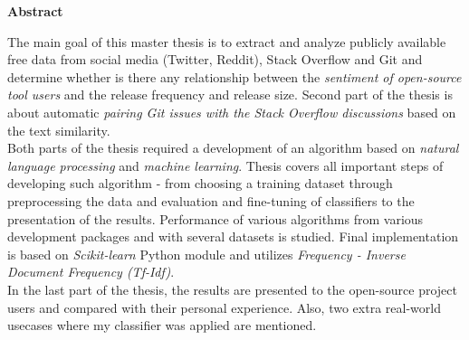 \begin{center}
\textbf{Abstract}
\end{center}

The main goal of this master thesis is to extract and analyze publicly available free data from social media (Twitter, Reddit), Stack Overflow and Git and determine whether is there any relationship between the \textit{sentiment of open-source tool users} and the release frequency and release size. Second part of the thesis is about automatic \textit{pairing Git issues with the Stack Overflow discussions} based on the text similarity.\\
Both parts of the thesis required a development of an algorithm based on \textit{natural language processing} and \textit{machine learning}. Thesis covers all important steps of developing such algorithm - from choosing a training dataset through preprocessing the data and evaluation and fine-tuning of classifiers to the presentation of the results. Performance of various algorithms from various development packages and with several datasets is studied. Final implementation is based on \textit{Scikit-learn} Python module and utilizes \textit{Frequency - Inverse Document Frequency (Tf-Idf)}.\\
In the last part of the thesis, the results are presented to the open-source project users and compared with their personal experience. Also, two extra real-world usecases where my classifier was applied are mentioned.